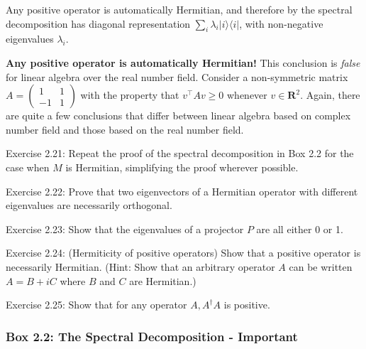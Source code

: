 Any positive operator is automatically Hermitian, and therefore by the spectral decomposition has diagonal representation $\sum_{i} \lambda_{i}|i\rangle\langle i|$, with non-negative eigenvalues $\lambda_{i}$.

\begin{remark}
    \textbf{Any positive operator is automatically Hermitian!} This conclusion is \textit{false} for linear algebra over the real number field. Consider a non-symmetric matrix $A=\left(\begin{array}{cc}
1 & 1 \\
-1 & 1
\end{array}\right)$ with the property that $v^{\top} A v \geq 0$ whenever $v \in \mathbf{R}^2.$ Again, there are quite a few conclusions that differ between linear algebra based on complex number field and those based on the real number field.
\end{remark}

\begin{exercise}
Exercise 2.21: Repeat the proof of the spectral decomposition in Box 2.2 for the case when $M$ is Hermitian, simplifying the proof wherever possible.
\end{exercise}

\begin{exercise}
Exercise 2.22: Prove that two eigenvectors of a Hermitian operator with different eigenvalues are necessarily orthogonal.
\end{exercise}

\begin{exercise}
Exercise 2.23: Show that the eigenvalues of a projector $P$ are all either 0 or 1.
\end{exercise}

\begin{exercise}
Exercise 2.24: (Hermiticity of positive operators) Show that a positive operator is necessarily Hermitian. (Hint: Show that an arbitrary operator $A$ can be written $A=B+i C$ where $B$ and $C$ are Hermitian.)
\end{exercise}

\begin{exercise}
Exercise 2.25: Show that for any operator $A, A^{\dagger} A$ is positive.
\end{exercise}

\subsubsection{Box 2.2: The Spectral Decomposition - Important}

